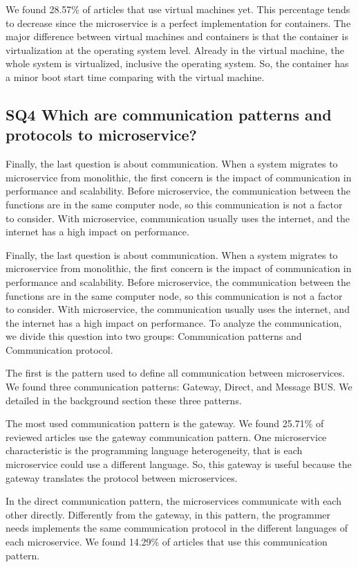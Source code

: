 We found 28.57\% of articles that use virtual machines yet. This percentage tends to decrease since the microservice is a perfect implementation for containers. The major difference between virtual machines and containers is that the container is virtualization at the operating system level. Already in the virtual machine, the whole system is virtualized, inclusive the operating system. So, the container has a minor boot start time comparing with the virtual machine.

\subsection{SQ4 Which are communication patterns and protocols to microservice?}
Finally, the last question is about communication. When a system migrates to microservice from monolithic, the first concern is the impact of communication in performance and scalability. Before microservice, the communication between the functions are in the same computer node, so this communication is not a factor to consider. With microservice, communication usually uses the internet, and the internet has a high impact on performance.

Finally, the last question is about communication. When a system migrates to microservice from monolithic, the first concern is the impact of communication in performance and scalability. Before microservice, the communication between the functions are in the same computer node, so this communication is not a factor to consider. With microservice, the communication usually uses the internet, and the internet has a high impact on performance. To analyze the communication, we divide this question into two groups: Communication patterns and Communication protocol.

The first is the pattern used to define all communication between microservices. We found three communication patterns: Gateway, Direct, and Message BUS. We detailed in the background section these three patterns.

The most used communication pattern is the gateway. We found 25.71\% of reviewed articles use the gateway communication pattern. One microservice characteristic is the programming language heterogeneity, that is each microservice could use a different language. So, this gateway is useful because the gateway translates the protocol between microservices.

In the direct communication pattern, the microservices communicate with each other directly.  Differently from the gateway, in this pattern, the programmer needs implements the same communication protocol in the different languages of each microservice. We found 14.29\% of articles that use this communication pattern.

